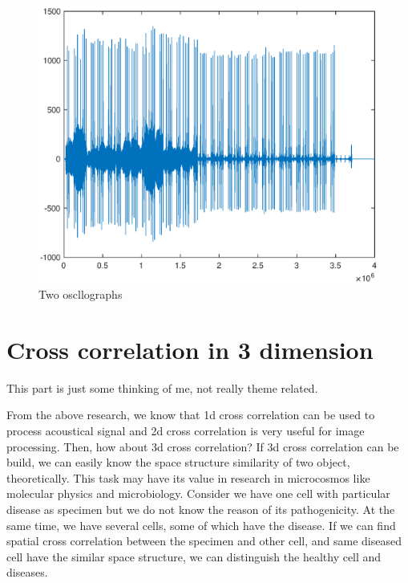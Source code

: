 \begin{figure}[h!]
	\centering
		\includegraphics[width=1\linewidth]{figures/part1/crr_vis3.eps}
	\caption{Two oscllographs}
	\label{fig:crr_vis3}
\end{figure} 

\section{Cross correlation in 3 dimension}

This part is just some thinking of me, not really theme related. 

From the above research, we know that 1d cross correlation can be used to process acoustical signal and 2d cross correlation is very useful for image processing. Then, how about 3d cross correlation? If 3d cross correlation can be build, we can easily know the space structure similarity of two object, theoretically. This task may have its value in research in microcosmos like molecular physics and microbiology. Consider we have one cell with particular disease as specimen but we do not know the reason of its pathogenicity. At the same time, we have several cells, some of which have the disease. If we can find spatial cross correlation between the specimen and other cell, and same diseased cell have the similar space structure, we can distinguish the healthy cell and diseases.